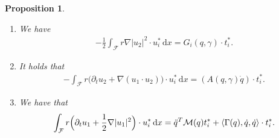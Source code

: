 \documentclass[10pt]{amsart}
\newcommand{\skpt}{\par\smallskip\noindent}
\newtheorem{proposition}[theorem]{Proposition}
\theoremstyle{definition}
\newcommand\scalar[2]{\langle #1,#2\rangle}
\newcommand\eq{=}
\newcommand\dd{\,\mathrm{d}}
\newcommand\dx{\dd x}
\let\de\partial
\begin{document}
\skpt
\begin{proposition}\label{Coefficients}
\begin{enumerate}
\item\label{Coefficientsa}
We have
\begin{align*}
-\frac{1}{2}\int_\mathcal{F} r\nabla|u_2|^2\cdot u_i^*\dx\eq G_i(q,\gamma)\cdot t_i^*.
\end{align*}
\item\label{Coefficientsb}
It holds that
\begin{align*}
-\int_\mathcal{F} r\bigl(\de_tu_2+\nabla(u_1\cdot u_2)\bigr)\cdot u_i^*\dx\eq (A(q,\gamma)\dot{q})\cdot t_i^*.
\end{align*}
\item\label{Coefficientsc}
We have that
\begin{align*}
\int_\mathcal{F} r\Bigl(\de_t u_1+\frac{1}{2}\nabla|u_1|^2 \Bigr)\cdot u_i^*\dx\eq \ddot{q}^T\mathcal{M}(q)t_i^*+\scalar{\Gamma(q),\dot{q}}{\dot{q}}\cdot t_i^*.
\end{align*}
\end{enumerate}
\end{proposition}
\end{document}
